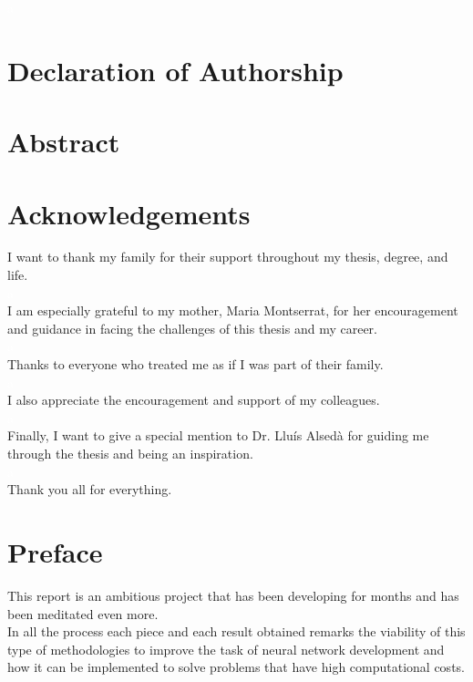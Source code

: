 \documentclass[a4paper, 11pt]{article}
\begin{document}
\justifying
\newpage
\textcolor{white}{a}
\newpage 

\section*{Declaration of Authorship}
\newpage
\section*{Abstract}
\newpage
\section*{Acknowledgements}
I want to thank my family for their support throughout my thesis, degree, and life.\\
\textcolor{white}{a}\\
I am especially grateful to my mother, Maria Montserrat, for her encouragement and guidance in facing the challenges of this thesis and my career.\\
\textcolor{white}{a}\\
Thanks to everyone who treated me as if I was part of their family.\\
\textcolor{white}{a}\\
I also appreciate the encouragement and support of my colleagues.\\
\textcolor{white}{a}\\
Finally, I want to give a special mention to Dr. Lluís Alsedà for guiding me through the thesis and being an inspiration.\\
\textcolor{white}{a}\\
Thank you all for everything.
\newpage

\tableofcontents
\listoffigures
\listoftables

\newpage
\section*{Preface}
This report is an ambitious project that has been developing for months and has been meditated even more.\\
In all the process each piece and each result obtained remarks the viability of this type of methodologies to improve the task of neural network development and how it can be implemented to solve problems that have high computational costs.

\newpage \pagestyle{extended_plain}
\setcounter{page}{2}
\end{document}
